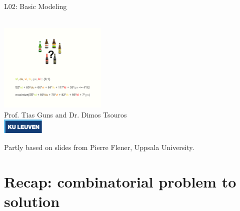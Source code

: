 \documentclass{cons-beamer}
\begin{document}
\begin{frame}{L02: Basic Modeling} %
  \begin{center}
    ~ \\
    \includegraphics[height=42mm]{images/beer_taste_prob.png} \\
    Prof. Tias Guns and Dr. Dimos Tsouros \\[0.5em]
    \includegraphics[width=2cm]{images/kuleuven_CMYK_logo.pdf}
  \end{center}
  
  {\footnotesize 
  Partly based on slides from Pierre Flener, Uppsala University.}
\end{frame}


\section{Recap: combinatorial problem to solution}
\end{document}
